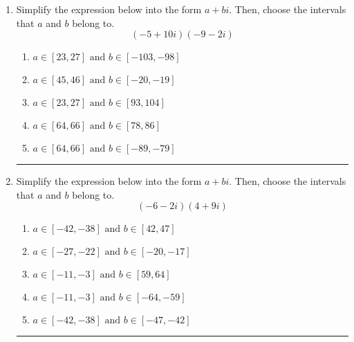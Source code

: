 \documentclass[14pt]{extbook}
\newcommand{\litem}[1]{\item#1\hspace*{-1cm}\rule{\textwidth}{0.4pt}}
\begin{document}
\begin{enumerate}
{\begin{enumerate}[label=\Alph*.]
\end{enumerate} }
\litem{
Simplify the expression below into the form $a+bi$. Then, choose the intervals that $a$ and $b$ belong to.\[ (-5 + 10 i)(-9 - 2 i) \]\begin{enumerate}[label=\Alph*.]
\item \( a \in [23, 27] \text{ and } b \in [-103, -98] \)
\item \( a \in [45, 46] \text{ and } b \in [-20, -19] \)
\item \( a \in [23, 27] \text{ and } b \in [93, 104] \)
\item \( a \in [64, 66] \text{ and } b \in [78, 86] \)
\item \( a \in [64, 66] \text{ and } b \in [-89, -79] \)

\end{enumerate} }
\litem{
Simplify the expression below into the form $a+bi$. Then, choose the intervals that $a$ and $b$ belong to.\[ (-6 - 2 i)(4 + 9 i) \]\begin{enumerate}[label=\Alph*.]
\item \( a \in [-42, -38] \text{ and } b \in [42, 47] \)
\item \( a \in [-27, -22] \text{ and } b \in [-20, -17] \)
\item \( a \in [-11, -3] \text{ and } b \in [59, 64] \)
\item \( a \in [-11, -3] \text{ and } b \in [-64, -59] \)
\item \( a \in [-42, -38] \text{ and } b \in [-47, -42] \)

\end{enumerate} }
\end{enumerate}
\end{document}
